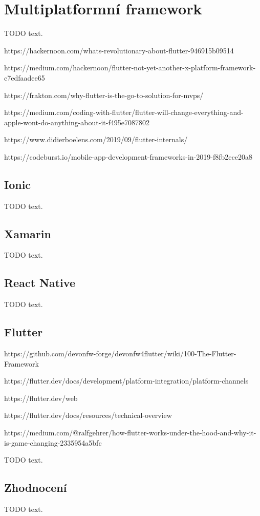 \section{Multiplatformní framework}

TODO text.

https://hackernoon.com/whats-revolutionary-about-flutter-946915b09514

https://medium.com/hackernoon/flutter-not-yet-another-x-platform-framework-c7edfaadee65

https://frakton.com/why-flutter-is-the-go-to-solution-for-mvps/

https://medium.com/coding-with-flutter/flutter-will-change-everything-and-apple-wont-do-anything-about-it-f495e7087802

https://www.didierboelens.com/2019/09/flutter-internals/

https://codeburst.io/mobile-app-development-frameworks-in-2019-f8fb2ece20a8


\subsection{Ionic}

TODO text.

\subsection{Xamarin}

TODO text.

\subsection{React Native}

TODO text.

\subsection{Flutter}

https://github.com/devonfw-forge/devonfw4flutter/wiki/100-The-Flutter-Framework

https://flutter.dev/docs/development/platform-integration/platform-channels

https://flutter.dev/web

https://flutter.dev/docs/resources/technical-overview

https://medium.com/@ralfgehrer/how-flutter-works-under-the-hood-and-why-it-is-game-changing-2335954a5bfc

TODO text.

\subsection{Zhodnocení}

TODO text.
